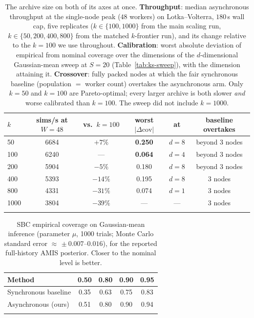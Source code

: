 \begin{table}[t]
\caption{The archive size on both of its axes at once. \textbf{Throughput}: median asynchronous throughput at the single-node peak ($48$ workers) on Lotka--Volterra, $180$\,s wall cap, five replicates ($k\in\{100,1000\}$ from the main scaling run, $k\in\{50,200,400,800\}$ from the matched $k$-frontier run), and its change relative to the $k{=}100$ we use throughout. \textbf{Calibration}: worst absolute deviation of empirical from nominal coverage over the dimensions of the $d$-dimensional Gaussian-mean sweep at $S{=}20$ (Table~\ref{tab:ks-sweep}), with the dimension attaining it. \textbf{Crossover}: fully packed nodes at which the fair synchronous baseline (population $=$ worker count) overtakes the asynchronous arm. Only $k{=}50$ and $k{=}100$ are Pareto-optimal; every larger archive is both slower \emph{and} worse calibrated than $k{=}100$. The sweep did not include $k{=}1000$.}\label{tab:k-frontier}
\centering
\begin{tabular}{@{}lccccc@{}}
\toprule
$k$ & sims/s at $W{=}48$ & vs.\ $k{=}100$ & worst $|\Delta\text{cov}|$ & at & baseline overtakes \\
\midrule
50   & 6684 & $+7\%$  & \textbf{0.250} & $d{=}8$ & beyond 3 nodes \\
100  & 6240 & ---     & \textbf{0.064} & $d{=}4$ & beyond 3 nodes \\
200  & 5904 & $-5\%$  & 0.180 & $d{=}8$ & beyond 3 nodes \\
400  & 5393 & $-14\%$ & 0.195 & $d{=}8$ & 3 nodes \\
800  & 4331 & $-31\%$ & 0.074 & $d{=}1$ & 3 nodes \\
1000 & 3804 & $-39\%$ & ---   & ---     & 3 nodes \\
\botrule
\end{tabular}
\end{table}

\begin{table}[t]
\caption{SBC empirical coverage on Gaussian-mean inference (parameter $\mu$, 1000 trials; Monte Carlo standard error ${\approx}\,\pm0.007$--$0.016$), for the reported full-history AMIS posterior. Closer to the nominal level is better.}\label{tab:sbc}
\centering
\begin{tabular}{@{}lcccc@{}}
\toprule
Method & 0.50 & 0.80 & 0.90 & 0.95 \\
\midrule
Synchronous baseline & 0.35 & 0.63 & 0.75 & 0.83 \\
Asynchronous (ours) & 0.51 & 0.80 & 0.90 & 0.94 \\
\botrule
\end{tabular}
\end{table}

